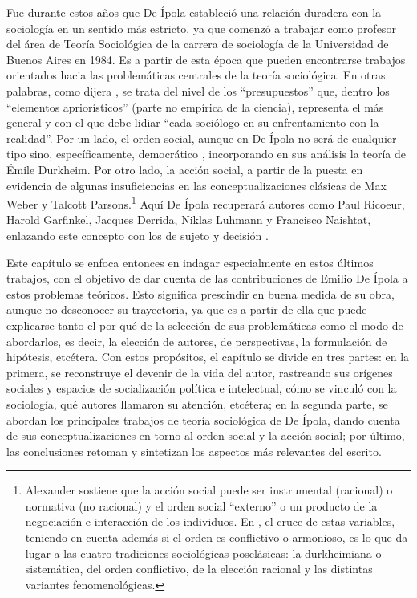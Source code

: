 {Fue durante estos años que De Ípola estableció una relación duradera con la sociología en un sentido más estricto, ya que comenzó a trabajar como profesor del área de Teoría Sociológica de la carrera de sociología de la Universidad de Buenos Aires en 1984. Es a partir de esta época que pueden encontrarse trabajos orientados hacia las problemáticas centrales de la teoría sociológica. En otras palabras, como dijera \textcite[18]{1516-ALEXANDER2008}, se trata del nivel de los \enquote{presupuestos} que, dentro los \enquote{elementos apriorísticos} (parte no empírica de la ciencia), representa el más general y con el que debe lidiar \enquote{cada sociólogo en su enfrentamiento con la realidad}. Por un lado, el orden social, aunque en De Ípola no será de cualquier tipo sino, específicamente, democrático \parencite{1540-PORTANTIERO1987,1592-DEIPOLA1997}, incorporando en sus análisis la teoría de Émile Durkheim. Por otro lado, la acción social, a partir de la puesta en evidencia de algunas insuficiencias en las conceptualizaciones clásicas de Max Weber y Talcott Parsons.\footnote{Alexander sostiene que la acción social puede ser instrumental (racional) o normativa (no racional) y el orden social \enquote{externo} o un producto de la negociación e interacción de los individuos. En \textcite{1584-COLLINS2000}, el cruce de estas variables, teniendo en cuenta además si el orden es conflictivo o armonioso, es lo que da lugar a las cuatro tradiciones sociológicas posclásicas: la durkheimiana o sistemática, del orden conflictivo, de la elección racional y las distintas variantes fenomenológicas.} Aquí De Ípola recuperará autores como Paul Ricoeur, Harold Garfinkel, Jacques Derrida, Niklas Luhmann y Francisco Naishtat, enlazando este concepto con los de sujeto y decisión \parencite{1600-DEIPOLA2001,1603-DEIPOLA2004}.

Este capítulo se enfoca entonces en indagar especialmente en estos últimos trabajos, con el objetivo de dar cuenta de las contribuciones de Emilio De Ípola a estos problemas teóricos. Esto significa prescindir en buena medida de su obra, aunque no desconocer su trayectoria, ya que es a partir de ella que puede explicarse tanto el por qué de la selección de sus problemáticas como el modo de abordarlos, es decir, la elección de autores, de perspectivas, la formulación de hipótesis, etcétera. Con estos propósitos, el capítulo se divide en tres partes: en la primera, se reconstruye el devenir de la vida del autor, rastreando sus orígenes sociales y espacios de socialización política e intelectual, cómo se vinculó con la sociología, qué autores llamaron su atención, etcétera; en la segunda parte, se abordan los principales trabajos de teoría sociológica de De Ípola, dando cuenta de sus conceptualizaciones en torno al orden social y la acción social; por último, las conclusiones retoman y sintetizan los aspectos más relevantes del escrito.

}
